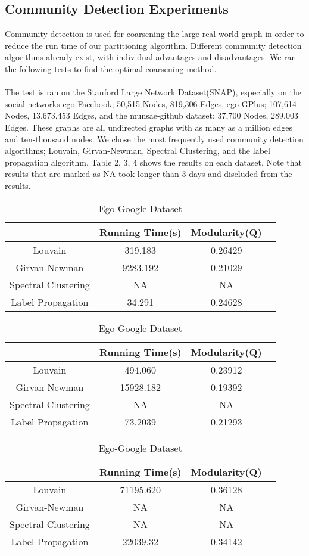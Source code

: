 \subsection{Community Detection Experiments}
Community detection is used for coarsening the large real world graph in order to reduce the run time of our partitioning algorithm. Different community detection algorithms already exist, with individual advantages and disadvantages. We ran the following tests to find the optimal coarsening method.
\\ \\ 
The test is ran on the Stanford Large Network Dataset(SNAP), especially on the social networks ego-Facebook; 50,515 Nodes, 819,306 Edges, ego-GPlus; 107,614 Nodes, 13,673,453 Edges, and the munsae-github dataset; 37,700 Nodes, 289,003 Edges. These graphs are all undirected graphs with as many as a million edges and ten-thousand nodes. We chose the most frequently used community detection algorithms; Louvain, Girvan-Newman, Spectral Clustering, and the label propagation algorithm. Table 2, 3, 4 shows the results on each dataset. Note that results that are marked as NA took longer than 3 days and discluded from the results. 
\begin{table}[H]
\centering
\caption{Musae-Github Dataset}
\label{t1}
\begin{tabular}{|c|c|c|c}
\noalign{\smallskip}\noalign{\smallskip}\hline
& Running Time(s) & Modularity(Q)\\
\hline
Louvain & 319.183 & 0.26429\\
\hline
Girvan-Newman & 9283.192 & 0.21029 \\
\hline
Spectral Clustering  & NA & NA \\
\hline
Label Propagation  & 34.291 & 0.24628 \\
\hline
\end{tabular}
\centering
\caption{Ego-Facebook Dataset}
\label{t1}
\begin{tabular}{|c|c|c|c|}
\noalign{\smallskip}\noalign{\smallskip}\hline
& Running Time(s) & Modularity(Q)\\
\hline
Louvain & 494.060 & 0.23912\\
\hline
Girvan-Newman & 15928.182 & 0.19392 \\
\hline
Spectral Clustering  & NA & NA \\
\hline
Label Propagation  & 73.2039 & 0.21293 \\
\hline
\end{tabular}
\centering
\caption{Ego-Google Dataset}
\label{t1}
\begin{tabular}{|c|c|c|c|}
\noalign{\smallskip}\noalign{\smallskip}\hline
& Running Time(s) & Modularity(Q)\\
\hline
Louvain & 71195.620 & 0.36128\\
\hline
Girvan-Newman & NA & NA \\
\hline
Spectral Clustering  & NA & NA \\
\hline
Label Propagation  & 22039.32 & 0.34142 \\
\hline
\end{tabular}
\end{table}

